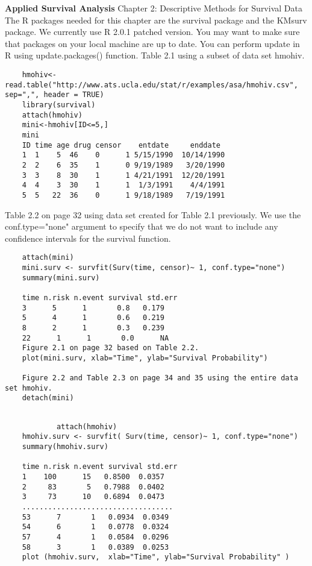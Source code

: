 \textbf{	Applied Survival Analysis}
	Chapter 2: Descriptive Methods for Survival Data
	The R packages needed for this chapter are the survival package and the KMsurv package. We currently use R 2.0.1 patched version. You may want to make sure that packages on your local machine are up to date. You can perform update in R using update.packages() function.
	Table 2.1 using a subset of data set hmohiv.
	
	\begin{framed}
	\begin{verbatim}
	hmohiv<-read.table("http://www.ats.ucla.edu/stat/r/examples/asa/hmohiv.csv", sep=",", header = TRUE) 
	library(survival)
	attach(hmohiv)
	mini<-hmohiv[ID<=5,]
	mini
	ID time age drug censor    entdate     enddate
	1  1    5  46    0      1 5/15/1990  10/14/1990 
	2  2    6  35    1      0 9/19/1989   3/20/1990 
	3  3    8  30    1      1 4/21/1991  12/20/1991 
	4  4    3  30    1      1  1/3/1991    4/4/1991 
	5  5   22  36    0      1 9/18/1989   7/19/1991 

\end{verbatim}
\end{framed}
	Table 2.2 on page 32 using data set created for Table 2.1 previously. We use the conf.type="none" argument to specify that we do not want to include any confidence intervals for the survival function.
		\begin{framed}
		\begin{verbatim}
	attach(mini)
	mini.surv <- survfit(Surv(time, censor)~ 1, conf.type="none")
	summary(mini.surv)
	
	time n.risk n.event survival std.err 
	3      5      1       0.8   0.179
	5      4      1       0.6   0.219
	8      2      1       0.3   0.239
	22      1      1       0.0      NA
	Figure 2.1 on page 32 based on Table 2.2.
	plot(mini.surv, xlab="Time", ylab="Survival Probability")
	
	Figure 2.2 and Table 2.3 on page 34 and 35 using the entire data set hmohiv.
	detach(mini)

\end{verbatim}
\end{framed}
	\begin{framed}
		\begin{verbatim}
		
			attach(hmohiv)
	hmohiv.surv <- survfit( Surv(time, censor)~ 1, conf.type="none")
	summary(hmohiv.surv)
	
	time n.risk n.event survival std.err
	1    100      15   0.8500  0.0357
	2     83       5   0.7988  0.0402
	3     73      10   0.6894  0.0473
	...................................
	53      7       1   0.0934  0.0349
	54      6       1   0.0778  0.0324
	57      4       1   0.0584  0.0296
	58      3       1   0.0389  0.0253
	plot (hmohiv.surv,  xlab="Time", ylab="Survival Probability" )

\end{verbatim}
\end{framed}
